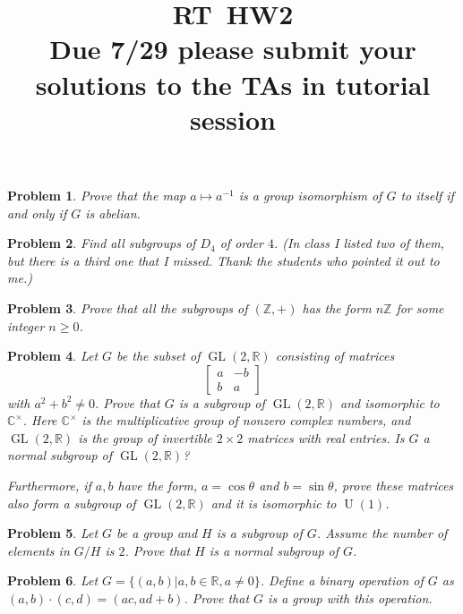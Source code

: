 \documentclass{article}
\title{RT\ HW2 \\ Due 7/29 please submit your solutions to the TAs in tutorial session}
\newtheorem{ex}{Problem}
\newcommand{\C}{\mathbb{C}}
\newcommand{\Z}{\mathbb{Z}}
\newcommand{\R}{\mathbb{R}}
\newcommand{\rr}{\mathbb{R}}
\newcommand{\GL}{\operatorname{GL}}
\newcommand{\U}{\operatorname{U}}
\begin{document}
\maketitle


\begin{ex}
 Prove that the map $a\mapsto a^{-1}$ is a group isomorphism of $G$ to itself if and only if $G$ is abelian. 
\end{ex}

\begin{ex}
 Find all subgroups of $D_4$ of order $4$. (In class I listed two of them, but there is a third one that I missed. Thank the students who pointed it out to me.)
\end{ex}

\begin{ex}
    Prove that all the subgroups of $(\Z,+)$ has the form $n\Z$ for some integer $n\geq 0$.
\end{ex}


\begin{ex}
Let $G$ be the subset of $\GL(2, \rr)$ consisting of matrices 
\[
\begin{bmatrix}
    a     & -b \\
     b   & a 
\end{bmatrix}\]
with $a^2+b^2\neq 0$. Prove that $G$ is a subgroup of $\GL(2, \R)$ and isomorphic to $\C^\times$. Here $\C^\times$ is the multiplicative group of nonzero complex numbers, and $\GL(2, \R)$ is the group of invertible $2\times 2$ matrices with real entries. Is $G$ a normal subgroup of $\GL(2, \R)$?

Furthermore, if $a,b$ have the form, $a=\cos \theta$ and $b=\sin \theta$, prove these matrices also form a subgroup of $\GL(2, \R)$ and it is isomorphic to $\U(1)$. 

\end{ex}

\begin{ex}
Let $G$ be a group and $H$ is a subgroup of $G$. Assume the number of elements in $G/H$ is $2$. Prove that $H$ is a normal subgroup of $G$.
\end{ex}

\begin{ex}
Let $G=\{(a,b)\vert a,b \in \mathbb{R}, a\neq 0\}$. Define a binary operation of $G$ as $(a,b)\cdot (c,d)=(ac,ad+b)$. Prove that $G$ is a group with this operation. 
\end{ex}
\end{document}
